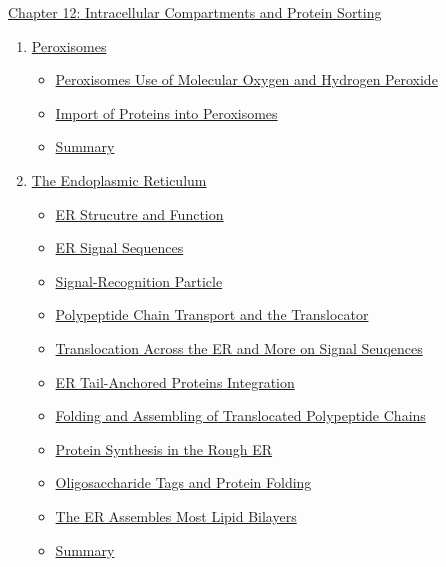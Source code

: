 \documentclass[12pt,letterpaper]{article}
\begin{document}
\begin{chapbox}{\hyperlink{home}{Chapter 12: Intracellular Compartments and Protein Sorting}}
\begin{enumerate}
            \begin{itemize}
                \item \hyperlink{12.3.1}{Translocation into Mitochondria}
                \item \hyperlink{12.3.2}{Mitochondrial Precursor Proteins}
                \item \hyperlink{12.3.3}{Protein Import into the Matrix Space}
                \item \hyperlink{12.3.4}{Bacterial and Mitochondrial Insertion of Poroins into Outer Membrane}
                \item \hyperlink{12.3.5}{Transport into the Inner Mitochondrial Membrane and Intermembrane Space}
                \item \hyperlink{12.3.6}{Protein Transport to Thylakoid Membrane in Chloroplasts}
                \item \hyperlink{12.3.r}{Summary}
            \end{itemize}
        \item \hyperlink{12.4}{Peroxisomes}
            \begin{itemize}
                \item \hyperlink{12.4.1}{Peroxisomes Use of Molecular Oxygen and Hydrogen Peroxide}
                \item \hyperlink{12.4.2}{Import of Proteins into Peroxisomes}
                \item \hyperlink{12.4.r}{Summary}
            \end{itemize}
        \item \hyperlink{12.5}{The Endoplasmic Reticulum}
            \begin{itemize}
                \item \hyperlink{12.5.1}{ER Strucutre and Function}
                \item \hyperlink{12.5.2}{ER Signal Sequences}
                \item \hyperlink{12.5.3}{Signal-Recognition Particle}
                \item \hyperlink{12.5.4}{Polypeptide Chain Transport and the Translocator}
                \item \hyperlink{12.5.5}{Translocation Across the ER and More on Signal Seuqences}
                \item \hyperlink{12.5.6}{ER Tail-Anchored Proteins Integration}
                \item \hyperlink{12.5.7}{Folding and Assembling of Translocated Polypeptide Chains}
                \item \hyperlink{12.5.8}{Protein Synthesis in the Rough ER}
                \item \hyperlink{12.5.9}{Oligosaccharide Tags and Protein Folding}
                \item \hyperlink{12.5.10}{The ER Assembles Most Lipid Bilayers}
                \item \hyperlink{12.5.r}{Summary}
            \end{itemize}
    \end{enumerate}
\end{chapbox}
\end{document}
